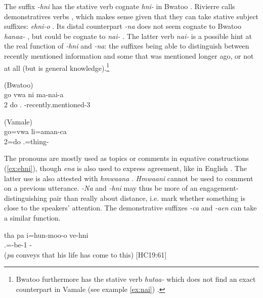 The suffix \textit{-hni} has the stative verb cognate \textit{hni-}  %
in Bwatoo \parencite[43]{rivierre_bwatoo_2006}. Rivierre calls demonstratives verbs \parencite[42]{rivierre_bwatoo_2006}, which makes sense given that they can take stative subject suffixes: \textit{ehni-o} . Its distal counterpart \textit{-na} does not seem cognate to Bwatoo \textit{hanaa-} , but could be cognate to \textit{nai-}  \parencite[43]{rivierre_bwatoo_2006}.
The latter verb \textit{nai-}  is a possible hint at the real function of \textit{-hni} and \textit{-na}: the suffixes being able to distinguish between recently mentioned information and some that was mentioned longer ago, or not at all (but is general knowledge).\footnote{Bwatoo furthermore has the stative verb \textit{hutaa-}  %
 which does not find an exact counterpart in Vamale (see example \ref{ex:nai}) \parencite[43]{rivierre_bwatoo_2006}.}


	\ea 
\label{ex:nai}
	(Bwatoo)\\
	\gll go vwa ni ma-nai-a\\
	 2 do . -recently.mentioned-3\\
	\glt {} \parencite[43]{rivierre_bwatoo_2006}
	\z	
	
	\ea
	(Vamale)\\
	\gll go=vwa li=aman-ca\\	
	 2=do .=thing-\\
	\glt {}
	\z


The pronouns are mostly used as topics or comments in equative constructions (\ref{ex:ehni}), though \textit{ena} is also used to express agreement, like in English . The latter use is also attested with \textit{hmwaana} . \textit{Hmwaani}  cannot be used to comment on a previous utterance. \textit{-Na} and \textit{-hni} may thus be more of an engagement-distinguishing pair than really about distance, i.e. mark whether something is close to the speakers' attention. The demonstrative suffixes \textit{-ca} and \textit{-aen} can take a similar function.

\ea \label{ex:ehni}
\gll  tha pa i=hun-moo-o ve-hni\\
   .=-be-1 -\\
\glt {} (\textit{pa} conveys that his life has come to this) {[HC19:61]}
\z

